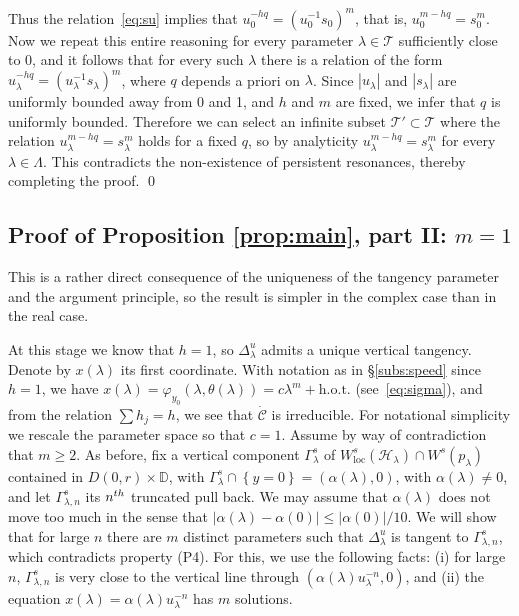\documentclass[11pt, oneside]{amsart}
\newcommand{\D}{\mathbb{D}}
\newcommand{\set}[1]{\left\{#1\right\}}
\newcommand{\abs}[1]{\left\vert#1\right\vert}
\newcommand{\loc}{{\mathrm{loc}}}
\newcommand{\hot}{{\mathrm{h.o.t.}}}
\newcommand{\inv}{^{-1}}
\theoremstyle{remark}
\theoremstyle{definition}
\theoremstyle{theorem}
\begin{document}
Thus the relation~\eqref{eq:su} implies that $u_0^{-hq} = (u_0\inv  s_0)^{m}$, that is, 
$u_0^{m-hq} = s_0^m$. 
 Now  we repeat  this entire reasoning for every parameter 
$\lambda\in \mathcal T$ sufficiently close to 0, and it follows that 
 for every such $\lambda$ there is a relation 
of the form $u_\lambda^{-hq } = (u_\lambda\inv  s_\lambda)^{m}$, where $q$ depends a priori on $\lambda$.
Since  $\abs{u_\lambda}$ and $\abs{s_\lambda}$ are  uniformly bounded 
 away from 0 and 1, and $h$ and $m$ are fixed, 
 we infer  that $q$ 
is uniformly bounded. Therefore we can 
 select an infinite subset  $\mathcal T'\subset \mathcal T$  where 
 the relation $u_\lambda^{m-hq} = s_\lambda^m$ holds for a fixed $q$, so by analyticity
$u_\lambda^{m-hq} = s_\lambda^m$ for every $\lambda\in \Lambda$. This contradicts the non-existence of persistent resonances, thereby completing    the proof. \qed

 
 

\subsection{Proof of Proposition \ref{prop:main},   part II: $m=1$} This is a rather direct consequence 
of the uniqueness of the tangency parameter and the argument principle, 
so the result is  simpler in the complex case  than in the real case.

At this stage we know that $h=1$, so $\Delta^u_\lambda$  admits 
 a unique vertical tangency. Denote by $x(\lambda)$ its first coordinate.
With notation as in \S\ref{subs:speed}  since $h=1$, we have    
 $x(\lambda) = \varphi_{y_0}(\lambda, \theta(\lambda)) = c\lambda^m+\hot$ (see~\eqref{eq:sigma}), 
 and from  the relation 
 $\sum h_j = h$, we see that  $\dot{\mathcal C}$ is irreducible.  
 For notational simplicity we rescale the parameter space so that 
 $c=1$. 
 Assume by way of contradiction that $m\geq 2$.
 As before, fix a  
  vertical component   $\Gamma^s_{\lambda}$ of 
$  W^s_\loc(\mathcal H_\lambda)\cap W^s(p_\lambda)$ contained in $D(0,r)\times \D$,
  with $\Gamma^s_\lambda\cap \set{y = 0}= (\alpha(\lambda), 0)$, with $\alpha(\lambda)\neq 0$, 
  and let $\Gamma^s_{\lambda, n}$ its  $n^{\rm th}$ truncated pull back.
  We may assume that $\alpha(\lambda)$ does not move too much in the sense that 
  $\abs{\alpha(\lambda) - \alpha(0)}\leq \abs{\alpha(0)}/10$. 
   We will 
  show that for large $n$ there are $m$ distinct parameters such that 
 $\Delta^u_\lambda$ is tangent to $\Gamma^s_{\lambda, n}$, 
 which contradicts  property (P4).
 For this, we use the following facts: (i) for large $n$,
 $\Gamma^s_{\lambda, n}$ is very close to the vertical line through 
 $(\alpha(\lambda)u_\lambda^{-n}, 0)$, and (ii) the equation 
 $x(\lambda) = \alpha(\lambda)u_\lambda^{-n}$ has $m$ solutions. 
 
\end{document}

